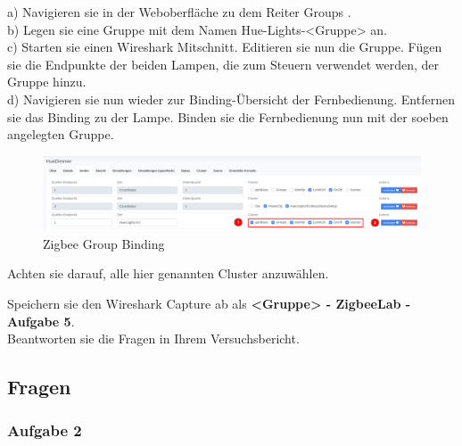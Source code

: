 a) Navigieren sie in der Weboberfläche zu dem Reiter \grqq Groups \grqq{}. \\
b) Legen sie eine Gruppe mit dem Namen \grqq Hue-Lights-<Gruppe> \grqq{} an.\\
c) Starten sie einen Wireshark Mitschnitt. Editieren sie nun die Gruppe. Fügen sie die Endpunkte der beiden Lampen, die zum Steuern verwendet werden, der Gruppe hinzu. \\
d) Navigieren sie nun wieder zur Binding-Übersicht der Fernbedienung. Entfernen sie das Binding zu der Lampe. Binden sie die Fernbedienung nun mit der soeben
angelegten Gruppe.

\begin{figure}[H]
    \centering
    \includegraphics[width=1\textwidth]{media/Z2M-Group-Binding.png}
    \caption{Zigbee Group Binding}
\end{figure}

Achten sie darauf, alle hier genannten Cluster anzuwählen.

\begin{Aufgabe}
    Speichern sie den Wireshark Capture ab als \textbf{\grqq <Gruppe> - ZigbeeLab - Aufgabe 5\grqq{}}. \\
    Beantworten sie die Fragen in Ihrem Versuchsbericht.
\end{Aufgabe}


\subsection{Fragen}
\subsubsection{Aufgabe 2}

